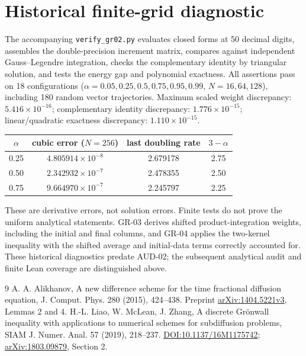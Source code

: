 \documentclass[11pt,a4paper]{article}
\begin{document}
\section{Historical finite-grid diagnostic}
The accompanying \texttt{verify\_gr02.py} evaluates closed forms at 50 decimal digits, assembles the double-precision increment matrix, compares against independent Gauss--Legendre integration, checks the complementary identity by triangular solution, and tests the energy gap and polynomial exactness. All assertions pass on 18 configurations ($\alpha=0.05,0.25,0.5,0.75,0.95,0.99$, $N=16,64,128$), including 180 random vector trajectories. Maximum scaled weight discrepancy: $5.416\times10^{-16}$; complementary identity discrepancy: $1.776\times10^{-15}$; linear/quadratic exactness discrepancy: $1.110\times10^{-15}$.
\begin{center}
\begin{tabular}{cccc}\toprule
$\alpha$ & cubic error ($N=256$) & last doubling rate & $3-\alpha$\\\midrule
0.25 & $4.805914\times10^{-8}$ & 2.679178 & 2.75\\
0.50 & $2.342932\times10^{-7}$ & 2.478355 & 2.50\\
0.75 & $9.664970\times10^{-7}$ & 2.245797 & 2.25\\\bottomrule
\end{tabular}
\end{center}
These are derivative errors, not solution errors. Finite tests do not prove the uniform analytical statements. GR-03 derives shifted product-integration weights, including the initial and final columns, and GR-04 applies the two-kernel inequality with the shifted average and initial-data terms correctly accounted for. These historical diagnostics predate AUD-02; the subsequent analytical audit and finite Lean coverage are distinguished above.
\begin{thebibliography}{9}
 A. A. Alikhanov, A new difference scheme for the time fractional diffusion equation, J. Comput. Phys. 280 (2015), 424--438. Preprint \href{https://arxiv.org/abs/1404.5221}{arXiv:1404.5221v3}, Lemmas 2 and 4.
 H.-L. Liao, W. McLean, J. Zhang, A discrete Gr\"onwall inequality with applications to numerical schemes for subdiffusion problems, SIAM J. Numer. Anal. 57 (2019), 218--237. \href{https://doi.org/10.1137/16M1175742}{DOI:10.1137/16M1175742}; \href{https://arxiv.org/abs/1803.09879}{arXiv:1803.09879}, Section 2.
\end{thebibliography}
\end{document}
